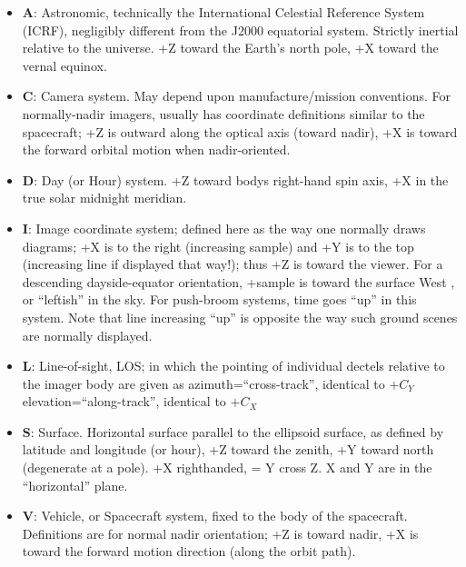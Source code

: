 \documentclass{article}
\begin{document}
 \begin{itemize}   
 \item $\mathbf{A}$: Astronomic, technically the International Celestial
   Reference System (ICRF), negligibly different from the J2000 equatorial
   system. Strictly inertial relative to the universe. +Z toward the Earth's
   north pole, +X toward the vernal equinox.

 \item $\mathbf{C}$: Camera system. May depend upon manufacture/mission
   conventions. For normally-nadir imagers, usually has coordinate definitions
   similar to the spacecraft; +Z is outward along the optical axis (toward
   nadir), +X is toward the forward orbital motion when nadir-oriented.
  
 \item $\mathbf{D}$: Day (or Hour) system. +Z toward bodys right-hand spin axis, +X in the true solar midnight meridian.
 
 \item $\mathbf{I}$: Image coordinate system; defined here as the way one
   normally draws diagrams; +X is to the right (increasing sample) and +Y is to
   the top (increasing line if displayed that way!); thus +Z is toward the
   viewer.  For a descending dayside-equator orientation, +sample is toward the
   surface West , or ``leftish'' in the sky. For push-broom systems,
   time goes ``up'' in this system. Note that line increasing ``up'' is opposite
   the way such ground scenes are normally displayed.
  
 \item $\mathbf{L}$: Line-of-sight, LOS; in which the pointing of individual dectels relative to the imager body are given as 
\qi azimuth=``cross-track'', identical to $+C_Y$ 
\qi elevation=``along-track'', identical to $+C_X$

 \item $\mathbf{S}$: Surface. Horizontal surface parallel to the ellipsoid surface,
 as defined by latitude and longitude (or hour), +Z toward the zenith, +Y toward north (degenerate at a pole). +X righthanded, = Y cross Z. X and Y are in the ``horizontal'' plane.
  
 \item $\mathbf{V}$: Vehicle, or Spacecraft system, fixed to the body of the
   spacecraft. Definitions are for normal nadir orientation; +Z is toward nadir,
   +X is toward the forward motion direction (along the orbit path).

  \end{itemize}
\end{document}
